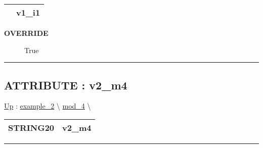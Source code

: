 {\renewcommand{\arraystretch}{1.5}
\begin{tabularx}{\textwidth}{|>{\raggedright\arraybackslash}l|X|}
\hline
\hspace{0pt} & v1\_i1 \\
\hline
\end{tabularx}
}

\par

\par
\begin{description}
\item [\textbf{OVERRIDE}] True
\end{description}

\rule{\linewidth}{0.5pt}
\subsection*{ATTRIBUTE : v2\_m4}
\hypertarget{ecldoc:intest.in1intest.example_2.mod_4.v2_m4}{}
\hyperlink{ecldoc:intest.in1intest.example_2.mod_4}{Up} :
\hspace{0pt} \hyperlink{ecldoc:intest.in1intest.example_2}{example_2} \textbackslash 
\hspace{0pt} \hyperlink{ecldoc:intest.in1intest.example_2.mod_4}{mod_4} \textbackslash 

{\renewcommand{\arraystretch}{1.5}
\begin{tabularx}{\textwidth}{|>{\raggedright\arraybackslash}l|X|}
\hline
\hspace{0pt}STRING20 & v2\_m4 \\
\hline
\end{tabularx}
}

\par


\rule{\linewidth}{0.5pt}




